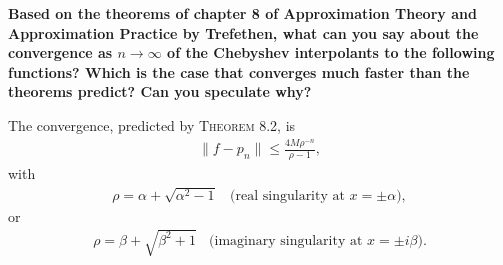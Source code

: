 \textbf{Based on the theorems of chapter 8 of Approximation Theory and Approximation Practice by Trefethen, what can you say about the convergence as $n\rightarrow\infty$ of the Chebyshev interpolants to the following functions? Which is the case that converges much faster than the theorems predict? Can you speculate why?}
\newline

The convergence, predicted by \textsc{Theorem 8.2}, is 
\begin{align*}
\|f-p_n\|\leq\frac{4M\rho^{-n}}{\rho-1},
\end{align*}
with 
\begin{align*}
\rho = \alpha+\sqrt{\alpha^2-1}~~~~\text{(real singularity at $x=\pm\alpha$)},
\end{align*}
or
\begin{align*}
\rho = \beta+\sqrt{\beta^2+1}~~~~\text{(imaginary singularity at $x=\pm i\beta$)}.
\end{align*}

